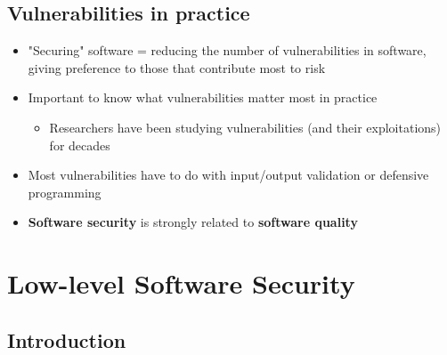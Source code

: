 \documentclass[12pt,titlepage,a4paper]{report}
\begin{document}
	\section{Vulnerabilities in practice}
	\begin{itemize}
		\item "Securing" software = reducing the number of vulnerabilities in software, giving preference to those that contribute most to risk
		\item Important to know what vulnerabilities matter most in practice
		\begin{itemize}
			\item Researchers have been studying vulnerabilities (and their exploitations) for decades
		\end{itemize}
		\item Most vulnerabilities have to do with input/output validation or defensive programming
		\item \textbf{Software security} is strongly related to \textbf{software quality}
	\end{itemize}


	\chapter{Low-level Software Security}
	\section{Introduction}
\end{document}
